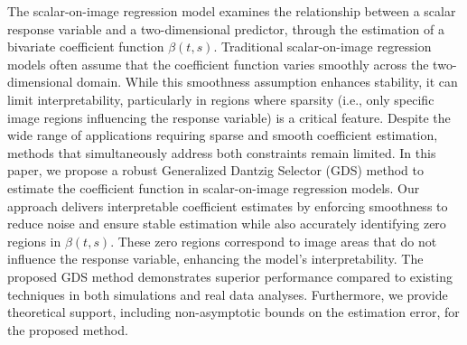 The scalar-on-image regression model examines the relationship between a scalar response variable and a two-dimensional predictor, through the estimation of a bivariate coefficient function $\beta(t,s)$. Traditional scalar-on-image regression models often assume that the coefficient function varies smoothly across the two-dimensional domain. While this smoothness assumption enhances stability, it can limit interpretability, particularly in regions where sparsity (i.e., only specific image regions influencing the response variable) is a critical feature. Despite the wide range of applications requiring sparse and smooth coefficient estimation, methods that simultaneously address both constraints remain limited. In this paper, we propose a robust Generalized Dantzig Selector (GDS) method to estimate the coefficient function in scalar-on-image regression models. Our approach delivers interpretable coefficient estimates by enforcing smoothness to reduce noise and ensure stable estimation while also accurately identifying zero regions in $\beta(t,s)$. These zero regions correspond to image areas that do not influence the response variable, enhancing the model's interpretability. The proposed GDS method demonstrates superior performance compared to existing techniques in both simulations and real data analyses. Furthermore, we provide theoretical support, including non-asymptotic bounds on the estimation error, for the proposed method. 